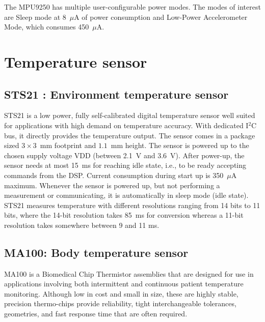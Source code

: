 The MPU9250 has multiple user-configurable power modes. The modes of
interest are Sleep mode at 8~$\mu$A of power consumption and
Low-Power Accelerometer Mode, which consumes 450~$\mu$A. 
 
\section{Temperature sensor}

\subsection{ STS21 : Environment temperature sensor}

STS21 is a low power, fully self-calibrated digital temperature
sensor well suited for applications with high demand on temperature
accuracy. With dedicated I$^2$C bus, it directly provides the
temperature output. The sensor comes in a package sized $3 \times
3$~mm footprint and $1.1$~mm height. The sensor is powered up to the
chosen supply voltage VDD (between 2.1~V and 3.6~V). After power-up,
the sensor needs at most 15~ms for reaching idle state, i.e., to be
ready accepting commands from the DSP. Current consumption during
start up is 350~$\mu$A maximum. Whenever the sensor is powered up,
but not performing a measurement or communicating, it is
automatically in sleep mode (idle state). STS21 measures temperature
with different resolutions ranging from 14 bits to 11 bits, where the
14-bit resolution takes 85~ms for conversion whereas a 11-bit
resolution takes somewhere between 9 and 11 ms.

\subsection{MA100: Body temperature sensor} 

MA100 is a Biomedical Chip Thermistor assemblies that are designed for use in applications involving both intermittent and continuous patient temperature monitoring. Although low in cost and small in size, these are highly stable, precision thermo-chips provide reliability, tight interchangeable tolerances, geometries, and fast response time that are often required.
 
